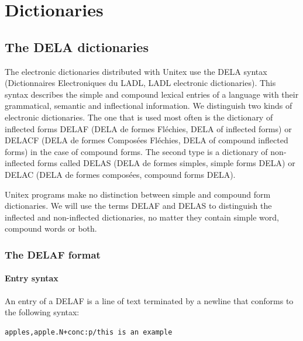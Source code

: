 \chapter{Dictionaries}
\label{chap-dictionaries}

\section{The DELA dictionaries}

The electronic dictionaries distributed with Unitex use the DELA syntax
(Dictionnaires Electroniques du LADL, LADL electronic dictionaries). This syntax
describes the simple and compound lexical entries  of a
language with their grammatical, semantic and inflectional information. We
distinguish two kinds of electronic dictionaries. The one that is used most often
is the  dictionary of inflected forms DELAF (DELA de formes Fl\'echies, DELA of
inflected forms) or DELACF (DELA de formes Compos\'ees Fl\'echies, DELA of
compound inflected forms) in the case of compound forms.
The second type is a dictionary of non-inflected forms called DELAS (DELA de
formes simples, simple forms DELA) or DELAC (DELA de formes compos\'ees,
compound forms DELA).

\bigskip
\noindent Unitex programs make no  distinction between simple and compound form
dictionaries. We will use the terms DELAF and DELAS to distinguish the
inflected and non-inflected dictionaries, no matter they contain simple word,
compound words or both. 

\subsection{The DELAF format}
\label{section-DELAF-format}
\subsubsection{Entry syntax}
\label{section-DELAF-entry-syntax}
An entry of a DELAF is a line of text terminated by a newline that conforms to
the following syntax:

\bigskip
\begin{verbatim}
apples,apple.N+conc:p/this is an example
\end{verbatim}

